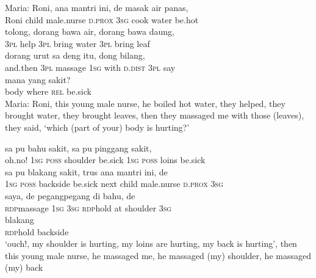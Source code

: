 \ea
\gll   Maria:    {Roni,}    {ana}    {mantri}    {ini,}   de    {masak}   air   panas,\\
  {}     {Roni}    {child}    {male.nurse}    {\textsc{d.prox}}   \textsc{3sg}    {cook}   water   be.hot\\
    {tolong,}    {dorang}    {bawa}    {air,}    {dorang}    {bawa}    {daung,}\\
   {\textsc{3pl}}    {help}    {\textsc{3pl}}    {bring}    {water}    {\textsc{3pl}}    {bring}    {leaf}\\
    {dorang}    {urut}    {sa}    {deng}    {itu,}   dong    {bilang,}\\
   {and.then}    {\textsc{3pl}}    {massage}    {\textsc{1sg}}    {with}    {\textsc{d.dist}}   \textsc{3pl}    {say}\\
    {mana}    {yang}    {sakit?}\\
   {body}    {where}    {\textsc{rel}}    {be.sick}\\
\glt
Maria: Roni, this young male nurse, he boiled hot water, they helped, they brought water, they brought leaves, then they massaged me with those (leaves), they said, ‘which (part of your) body is hurting?’
\z

\ea
{}    {sa}    {pu}    {bahu}    {sakit,}    {sa}    {pu}    {pinggang}    {sakit,}\\
   {oh.no!}    {\textsc{1sg}}    {\textsc{poss}}    {shoulder}    {be.sick}    {\textsc{1sg}}    {\textsc{poss}}    {loins}    {be.sick}\\
\gll sa    {pu}    {blakang}    {sakit,}   trus    {ana}    {mantri}    {ini,}   de\\
  \textsc{1sg}    {\textsc{poss}}    {backside}    {be.sick}   next    {child}    {male.nurse}    {\textsc{d.prox}}   \textsc{3sg}\\
    {saya,}    {de}    {pegang{\Tilde}pegang}    {di}    {bahu,}    {de}\\
   {\textsc{rdp}{\Tilde}massage}    {\textsc{1sg}}    {\textsc{3sg}}    {\textsc{rdp}{\Tilde}hold}    {at}    {shoulder}    {\textsc{3sg}}\\
    {blakang}\\
   {\textsc{rdp}{\Tilde}hold}    {backside}\\
\glt
‘ouch!, my shoulder is hurting, my loins are hurting, my back is hurting’, then this young male nurse, he massaged me, he massaged (my) shoulder, he massaged (my) back
\z

